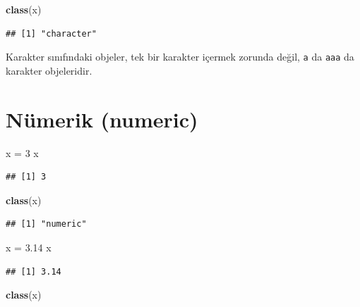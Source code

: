 \documentclass[
]{book}
\newenvironment{Shaded}{\begin{snugshade}}{\end{snugshade}}
\newcommand{\DecValTok}[1]{\textcolor[rgb]{0.00,0.00,0.81}{#1}}
\newcommand{\FloatTok}[1]{\textcolor[rgb]{0.00,0.00,0.81}{#1}}
\newcommand{\KeywordTok}[1]{\textcolor[rgb]{0.13,0.29,0.53}{\textbf{#1}}}
\newcommand{\NormalTok}[1]{#1}
\newcommand{\StringTok}[1]{\textcolor[rgb]{0.31,0.60,0.02}{#1}}
\begin{document}
\begin{Shaded}
\begin{Highlighting}[]
\KeywordTok{class}\NormalTok{(x)}
\end{Highlighting}
\end{Shaded}

\begin{verbatim}
## [1] "character"
\end{verbatim}

Karakter sınıfındaki objeler, tek bir karakter içermek zorunda değil, \texttt{\textquotesingle{}a\textquotesingle{}} da \texttt{\textquotesingle{}aaa\textquotesingle{}} da karakter objeleridir.

\hypertarget{nuxfcmerik-numeric}{%
\section{Nümerik (numeric)}\label{nuxfcmerik-numeric}}

\begin{Shaded}
\begin{Highlighting}[]
\NormalTok{x =}\StringTok{ }\DecValTok{3}
\NormalTok{x}
\end{Highlighting}
\end{Shaded}

\begin{verbatim}
## [1] 3
\end{verbatim}

\begin{Shaded}
\begin{Highlighting}[]
\KeywordTok{class}\NormalTok{(x)}
\end{Highlighting}
\end{Shaded}

\begin{verbatim}
## [1] "numeric"
\end{verbatim}

\begin{Shaded}
\begin{Highlighting}[]
\NormalTok{x =}\StringTok{ }\FloatTok{3.14}
\NormalTok{x}
\end{Highlighting}
\end{Shaded}

\begin{verbatim}
## [1] 3.14
\end{verbatim}

\begin{Shaded}
\begin{Highlighting}[]
\KeywordTok{class}\NormalTok{(x)}
\end{Highlighting}
\end{Shaded}
\end{document}
